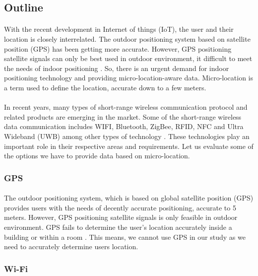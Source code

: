 \documentclass[12pt]{article}
\begin{document}
\subsection{Outline}

\paragraph{}With the recent development in Internet of things (IoT), the user and their location is closely interrelated. The outdoor positioning system based on satellite position (GPS) has been getting more accurate. However, GPS positioning satellite signals can only be best used in outdoor environment, it difficult to meet the needs of indoor positioning  \cite{indoor}. So, there is an urgent demand for indoor positioning technology and providing micro-location-aware data. Micro-location is a term used to define the location, accurate down to a few meters. 

\paragraph{}In recent years, many types of short-range wireless communication protocol and related products are emerging in the market. Some of the short-range wireless data communication includes WIFI, Bluetooth, ZigBee, RFID, NFC and Ultra Wideband (UWB) among other types of technology \cite{indoorPositioning}. These technologies play an important role in their respective areas and requirements. Let us evaluate some of the options we have to provide data based on micro-location.

\subsubsection{GPS}
\paragraph{} The outdoor positioning system, which is based on global satellite position (GPS) provides users with the needs of decently accurate positioning, accurate to 5 meters. However, GPS positioning satellite signals is only feasible in outdoor environment. GPS fails to determine the user's location accurately inside a building or within a room \cite{indoor}. This means, we cannot use GPS in our study as we need to accurately determine users location.

\subsubsection{Wi-Fi}
\end{document}
